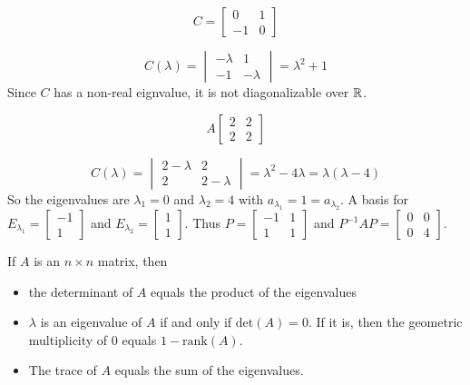 \documentclass[english, 12pt]{article}
\begin{document}
\begin{exmp}
\[C = \begin{bmatrix} 0 & 1 \\ -1 & 0 \end{bmatrix}\]
\begin{sol}
\[C(\lambda) = \begin{vmatrix} - \lambda & 1 \\ -1 & -\lambda \end{vmatrix} = \lambda^2 + 1\]
Since $C$ has a non-real eignvalue, it is not diagonalizable over ${\mathbb{R}}$.
\end{sol}
\end{exmp}

\begin{exmp}
\[A \begin{bmatrix} 2 & 2 \\ 2 & 2 \end{bmatrix}\]
\begin{sol}
\[C(\lambda) = \begin{vmatrix} 2 - \lambda & 2 \\ 2 & 2 - \lambda \end{vmatrix} = \lambda^2 - 4\lambda = \lambda(\lambda -4)\]
So the eigenvalues are $\lambda_1 = 0$ and $\lambda_2 = 4$ with $a_{\lambda_1} = 1 = a_{\lambda_2}$.\n
A basis for $E_{\lambda_1} = \begin{bmatrix} -1 \\ 1 \end{bmatrix}$ and $E_{\lambda_2} = \begin{bmatrix} 1 \\ 1 \end{bmatrix}$. \n
Thus $P = \begin{bmatrix} -1 & 1 \\ 1 & 1 \end{bmatrix}$ and $P^{-1}AP = \begin{bmatrix} 0 & 0 \\ 0 & 4 \end{bmatrix}$.
\end{sol}
\end{exmp}

\begin{thrm}
If $A$ is an $n\times n$ matrix, then
\begin{itemize}
\item the determinant of $A$ equals the product of the eigenvalues
\item $\lambda$ is an eigenvalue of $A$ if and only if $\text{det}(A) = 0$. If it is, then the geometric multiplicity of $0$ equals $1 - \text{rank}(A)$.
\item The trace of $A$ equals the sum of the eigenvalues.
\end{itemize}
\end{thrm}
\end{document}
